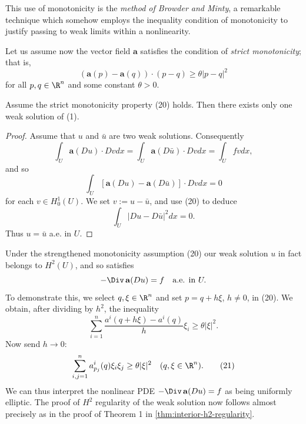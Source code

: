 \begin{remark}
\label{rem:browder-minty-method}
This use of monotonicity is the \textit{method of Browder and Minty}, a remarkable technique which somehow employs the inequality condition of monotonicity to justify passing to weak limits within a nonlinearity.
\end{remark}

Let us assume now the vector field $\mathbf{a}$ satisfies the condition of \textit{strict monotonicity}; that is,
\[
(\mathbf{a}(p) - \mathbf{a}(q)) \cdot (p - q) \geq \theta|p - q|^2
\tag{20}
\]
for all $p, q \in \R^n$ and some constant $\theta > 0$.

\begin{theorem}
\label{thm:monotonicity-uniqueness-weak-solution}
Assume the strict monotonicity property (20) holds. Then there exists only one weak solution of (1).
\end{theorem}
\begin{proof}
Assume that $u$ and $\bar{u}$ are two weak solutions. Consequently
\[
\int_U \mathbf{a}(Du) \cdot Dv dx = \int_U \mathbf{a}(D\bar{u}) \cdot Dv dx = \int_U fv dx,
\]
and so
\[
\int_U [\mathbf{a}(Du) - \mathbf{a}(D\bar{u})] \cdot Dv dx = 0
\]
for each $v \in H_0^1(U)$. We set $v := u - \bar{u}$, and use (20) to deduce
\[
\int_U |Du - D\bar{u}|^2 dx = 0.
\]
Thus $u = \bar{u}$ a.e. in $U$.
\end{proof}

\begin{remark}
\label{rem:monotonicity-h2-regularity}
Under the strengthened monotonicity assumption (20) our weak solution $u$ in fact belongs to $H^2(U)$, and so satisfies
\[
-\Div\,\mathbf{a}(Du) = f \quad \text{a.e. in } U.
\]
To demonstrate this, we select $q, \xi \in \R^n$ and set $p = q + h\xi$, $h \neq 0$, in (20). We obtain, after dividing by $h^2$, the inequality
\[
\sum_{i=1}^{n} \frac{a^i(q + h\xi) - a^i(q)}{h} \xi_i \geq \theta|\xi|^2.
\]
Now send $h \to 0$:
\[
\sum_{i,j=1}^{n} a^i_{p_j}(q)\xi_i\xi_j \geq \theta|\xi|^2 \quad (q, \xi \in \R^n).
\tag{21}
\]
We can thus interpret the nonlinear PDE $-\Div\,\mathbf{a}(Du) = f$ as being uniformly elliptic. The proof of $H^2$ regularity of the weak solution now follows almost precisely as in the proof of Theorem 1 in \cref{thm:interior-h2-regularity}.
\end{remark}


